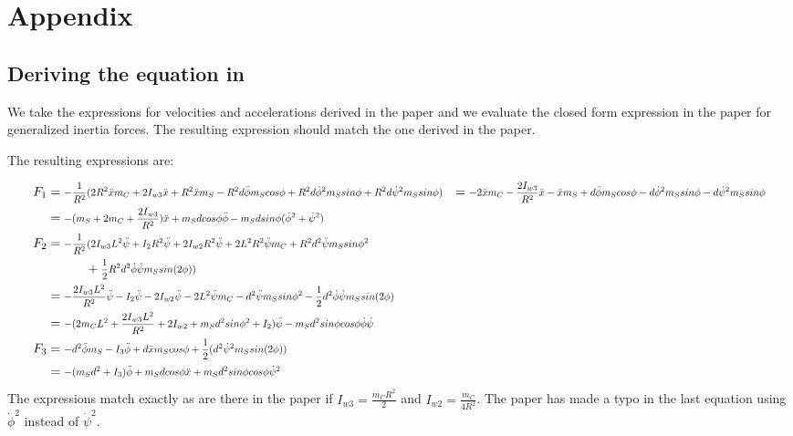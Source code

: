\documentclass[a4paper,10pt]{article}
\newcommand\scalemath[2]{\scalebox{#1}{\mbox{\ensuremath{\displaystyle #2}}}}
\begin{document}
 
\section{Appendix}
\subsection{Deriving the equation in \cite{kim2005dynamic}}
We take the expressions for velocities and accelerations derived in the paper and we evaluate the closed form
expression in the paper for generalized inertia forces. The resulting expression should match the one derived 
in the paper.



The resulting expressions are:

\begin{align}
 F_1 &= \scalemath{0.8}{-\frac{1}{R^2}(2R^2\ddot{x}m_C + 2I_{w3}\ddot{x} + R^2\ddot{x}m_S - R^2d\ddot{\phi}m_Scos\phi + R^2d\dot{\phi}^2m_Ssin\phi + R^2d\dot{\psi}^2m_Ssin\phi)} \nonumber 
     &= \scalemath{0.8}{-2\ddot{x}m_C - \frac{2I_{w3}}{R^2}\ddot{x} - \ddot{x}m_S + d\ddot{\phi}m_Scos\phi - d\dot{\phi}^2m_Ssin\phi - d\dot{\psi}^2m_Ssin\phi} \nonumber \\
     &= \scalemath{0.8}{-(m_S + 2m_C + \frac{2I_{w3}}{R^2})\ddot{x} + m_Sdcos\phi\ddot{\phi} - m_Sdsin\phi(\dot{\phi}^2 + \dot{\psi}^2)} \nonumber \\
 F_2 &= \scalemath{0.8}{-\frac{1}{R^2}(2I_{w3}L^2\ddot{\psi} + I_2R^2\ddot{\psi} + 2I_{w2}R^2\ddot{\psi} + 2L^2R^2\ddot{\psi}m_C + R^2d^2\ddot{\psi}m_Ssin\phi^2} \nonumber \\ 
         & \hskip 3em + \scalemath{0.8}{\frac{1}{2}R^2d^2\dot{\phi}\dot{\psi}m_Ssin(2\phi))} \nonumber \\
     &= \scalemath{0.8}{-\frac{2I_{w3}L^2}{R^2}\ddot{\psi} - I_2\ddot{\psi} - 2I_{w2}\ddot{\psi} - 2L^2\ddot{\psi}m_C - d^2\ddot{\psi}m_Ssin\phi^2 - \frac{1}{2}d^2\dot{\phi}\dot{\psi}m_Ssin(2\phi)} \nonumber \\
     &= \scalemath{0.8}{-(2m_CL^2 +\frac{2I_{w3}L^2}{R^2} + 2I_{w2} + m_Sd^2sin\phi^2 + I_2 )\ddot{\psi} - m_Sd^2sin\phi cos\phi\dot{\phi}\dot{\psi}} \nonumber \\
 F_3 &= \scalemath{0.8}{-d^2\ddot{\phi}m_S - I_3\ddot{\phi} + d\ddot{x}m_Scos\phi + \frac{1}{2}(d^2\dot{\psi}^2m_Ssin(2\phi))} \nonumber \\
     &= \scalemath{0.8}{-(m_Sd^2 + I_3)\ddot{\phi} + m_Sdcos\phi\ddot{x} + m_Sd^2sin\phi cos\phi\dot{\psi}^2} \nonumber  
\end{align}
The expressions match exactly as are there in the paper if $I_{w3} = \frac{m_CR^2}{2}$ and $I_{w2} = \frac{m_C}{4R^2}$.
The paper has made a typo in the last equation using $\dot{\phi}^2$ instead of $\dot{\psi}^2$. 
\end{document}
